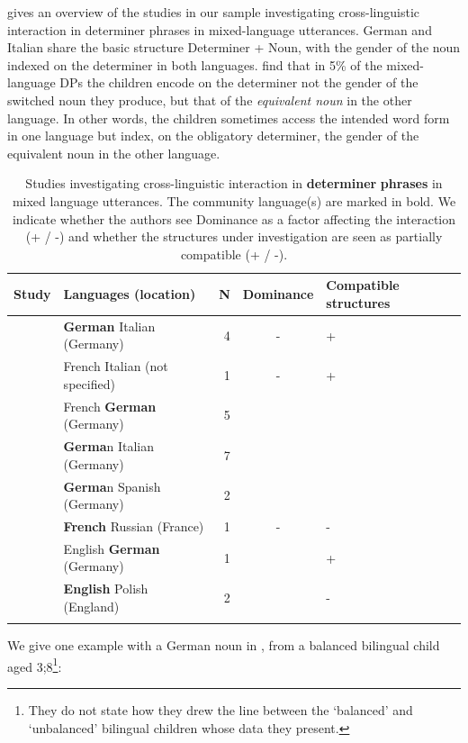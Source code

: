 \documentclass[output=paper]{langscibook}
\begin{document}
 gives an overview of the studies in our sample investigating cross-linguistic interaction in determiner phrases in mixed-language utterances. German and Italian share the basic structure Determiner + Noun, with the gender of the noun indexed on the determiner in both languages. \citet{CantoneMüller2008} find that in 5\% of the mixed-language DPs the children encode on the determiner not the gender of the switched noun they produce, but that of the \textit{equivalent noun} in the other language. In other words, the children sometimes access the intended word form in one language but index, on the obligatory determiner, the gender of the equivalent noun in the other language.

\begin{table}
\begin{tabularx}{\textwidth}{QQrcp{1.8cm}}
\lsptoprule
{ Study} & { Languages} { (location)} & { N} & {{ Dominance}} & { Compatible structures}\\
\midrule
\citet{CantoneMüller2008} & \textbf{German} Italian (Germany) & 4 & - & { +}\\
\tablevspace
\citet{EichlerEtAl2012} & French Italian (not specified) & 1 & { -} & +\\
& French \textbf{German} (Germany) & 5 &  &   \\
& \textbf{Germa}n Italian (Germany) & 7 &  &   \\
& \textbf{Germa}n Spanish (Germany) & 2 &  &  \\
\tablevspace
\citet{GaskinsEtAl2021} & \textbf{French} Russian (France) & 1 & { -}& -\\
& English \textbf{German} (Germany) & 1 &  &   +\\
& \textbf{English} Polish (England) & 2 &  & -\\
\lspbottomrule
\end{tabularx}
\caption{Studies investigating cross-linguistic interaction in \textbf{determiner} \textbf{phrases} in mixed language utterances. The community language(s) are marked in bold. We indicate whether the authors see Dominance as a factor affecting the interaction (+ / -) and whether the structures under investigation are seen as partially compatible  (+ / -).}
\label{tab:vihmannvihmann:9}
\end{table}

We give one example with a German noun in , from a balanced bilingual child aged 3;8\footnote{They do not state how they drew the line between the ‘balanced’ and ‘unbalanced’ bilingual children whose data they present.}:
\end{document}
